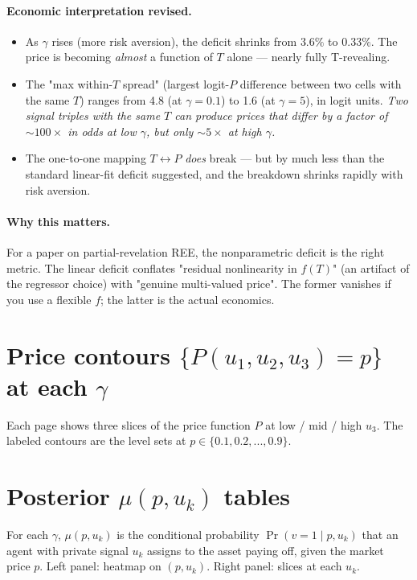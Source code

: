 \documentclass[11pt]{article}
\begin{document}
\paragraph{Economic interpretation revised.}
\begin{itemize}
  \item As $\gamma$ rises (more risk aversion), the deficit shrinks from
        $3.6\%$ to $0.33\%$. The price is becoming \emph{almost} a
        function of $T$ alone --- nearly fully T-revealing.
  \item The "max within-$T$ spread" (largest logit-$P$ difference between
        two cells with the same $T$) ranges from 4.8 (at $\gamma{=}0.1$)
        to 1.6 (at $\gamma{=}5$), in logit units. \emph{Two signal
        triples with the same $T$ can produce prices that differ by a
        factor of $\sim 100\!\times$ in odds at low $\gamma$, but only
        $\sim 5\!\times$ at high $\gamma$.}
  \item The one-to-one mapping $T \leftrightarrow P$ \emph{does} break ---
        but by much less than the standard linear-fit deficit suggested,
        and the breakdown shrinks rapidly with risk aversion.
\end{itemize}

\paragraph{Why this matters.} For a paper on partial-revelation REE, the
nonparametric deficit is the right metric. The linear deficit conflates
"residual nonlinearity in $f(T)$" (an artifact of the regressor choice)
with "genuine multi-valued price". The former vanishes if you use a
flexible $f$; the latter is the actual economics.

\section{Price contours $\{P(u_1, u_2, u_3) = p\}$ at each $\gamma$}

Each page shows three slices of the price function $P$ at low / mid / high
$u_3$. The labeled contours are the level sets at $p \in \{0.1, 0.2, ..., 0.9\}$.



\section{Posterior $\mu(p, u_k)$ tables}

For each $\gamma$, $\mu(p, u_k)$ is the conditional probability $\Pr(v=1 \mid p, u_k)$
that an agent with private signal $u_k$ assigns to the asset paying off, given the
market price $p$. Left panel: heatmap on $(p, u_k)$. Right panel: slices at each $u_k$.
\end{document}
